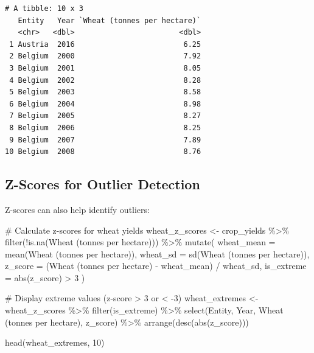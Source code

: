 \documentclass[
  letterpaper,
]{book}
\newenvironment{Shaded}{\begin{snugshade}}{\end{snugshade}}
\newcommand{\AttributeTok}[1]{\textcolor[rgb]{0.40,0.45,0.13}{#1}}
\newcommand{\CommentTok}[1]{\textcolor[rgb]{0.37,0.37,0.37}{#1}}
\newcommand{\DecValTok}[1]{\textcolor[rgb]{0.68,0.00,0.00}{#1}}
\newcommand{\FunctionTok}[1]{\textcolor[rgb]{0.28,0.35,0.67}{#1}}
\newcommand{\NormalTok}[1]{\textcolor[rgb]{0.00,0.23,0.31}{#1}}
\newcommand{\OtherTok}[1]{\textcolor[rgb]{0.00,0.23,0.31}{#1}}
\newcommand{\SpecialCharTok}[1]{\textcolor[rgb]{0.37,0.37,0.37}{#1}}
\newcommand{\StringTok}[1]{\textcolor[rgb]{0.13,0.47,0.30}{#1}}
\begin{document}
\begin{verbatim}
# A tibble: 10 x 3
   Entity   Year `Wheat (tonnes per hectare)`
   <chr>   <dbl>                        <dbl>
 1 Austria  2016                         6.25
 2 Belgium  2000                         7.92
 3 Belgium  2001                         8.05
 4 Belgium  2002                         8.28
 5 Belgium  2003                         8.58
 6 Belgium  2004                         8.98
 7 Belgium  2005                         8.27
 8 Belgium  2006                         8.25
 9 Belgium  2007                         7.89
10 Belgium  2008                         8.76
\end{verbatim}

\subsection{Z-Scores for Outlier
Detection}\label{z-scores-for-outlier-detection}

Z-scores can also help identify outliers:

\begin{Shaded}
\begin{Highlighting}[]
\CommentTok{\# Calculate z{-}scores for wheat yields}
\NormalTok{wheat\_z\_scores }\OtherTok{\textless{}{-}}\NormalTok{ crop\_yields }\SpecialCharTok{\%\textgreater{}\%}
  \FunctionTok{filter}\NormalTok{(}\SpecialCharTok{!}\FunctionTok{is.na}\NormalTok{(}\StringTok{\textasciigrave{}}\AttributeTok{Wheat (tonnes per hectare)}\StringTok{\textasciigrave{}}\NormalTok{)) }\SpecialCharTok{\%\textgreater{}\%}
  \FunctionTok{mutate}\NormalTok{(}
    \AttributeTok{wheat\_mean =} \FunctionTok{mean}\NormalTok{(}\StringTok{\textasciigrave{}}\AttributeTok{Wheat (tonnes per hectare)}\StringTok{\textasciigrave{}}\NormalTok{),}
    \AttributeTok{wheat\_sd =} \FunctionTok{sd}\NormalTok{(}\StringTok{\textasciigrave{}}\AttributeTok{Wheat (tonnes per hectare)}\StringTok{\textasciigrave{}}\NormalTok{),}
    \AttributeTok{z\_score =}\NormalTok{ (}\StringTok{\textasciigrave{}}\AttributeTok{Wheat (tonnes per hectare)}\StringTok{\textasciigrave{}} \SpecialCharTok{{-}}\NormalTok{ wheat\_mean) }\SpecialCharTok{/}\NormalTok{ wheat\_sd,}
    \AttributeTok{is\_extreme =} \FunctionTok{abs}\NormalTok{(z\_score) }\SpecialCharTok{\textgreater{}} \DecValTok{3}
\NormalTok{  )}

\CommentTok{\# Display extreme values (z{-}score \textgreater{} 3 or \textless{} {-}3)}
\NormalTok{wheat\_extremes }\OtherTok{\textless{}{-}}\NormalTok{ wheat\_z\_scores }\SpecialCharTok{\%\textgreater{}\%}
  \FunctionTok{filter}\NormalTok{(is\_extreme) }\SpecialCharTok{\%\textgreater{}\%}
  \FunctionTok{select}\NormalTok{(Entity, Year, }\StringTok{\textasciigrave{}}\AttributeTok{Wheat (tonnes per hectare)}\StringTok{\textasciigrave{}}\NormalTok{, z\_score) }\SpecialCharTok{\%\textgreater{}\%}
  \FunctionTok{arrange}\NormalTok{(}\FunctionTok{desc}\NormalTok{(}\FunctionTok{abs}\NormalTok{(z\_score)))}

\FunctionTok{head}\NormalTok{(wheat\_extremes, }\DecValTok{10}\NormalTok{)}
\end{Highlighting}
\end{Shaded}
\end{document}
